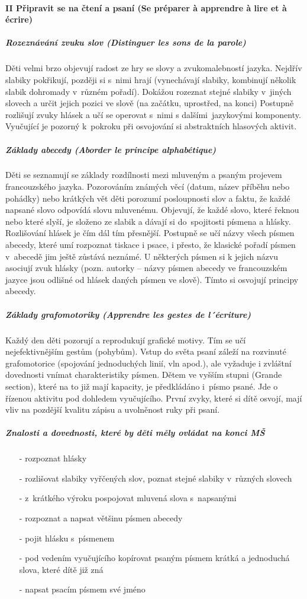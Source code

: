 			\paragraph*{II Připravit se na čtení a psaní (Se préparer à apprendre à lire et à écrire)}
				\subparagraph{Rozeznávání zvuku slov (Distinguer les sons de la parole)}
					Děti velmi brzo objevují radost ze hry se slovy a zvukomalebností jazyka. Nejdřív slabiky pokřikují, později si s nimi hrají (vynechávají slabiky, kombinují několik slabik dohromady v různém pořadí). Dokážou rozeznat stejné slabiky v jiných slovech a určit jejich pozici ve slově (na začátku, uprostřed, na konci)
					Postupně rozlišují zvuky hlásek a učí se operovat s nimi s dalšími jazykovými komponenty. Vyučující je pozorný k pokroku při osvojování si abstraktních hlasových aktivit.
				\subparagraph{Základy abecedy (Aborder le principe alphabétique)}
					Děti se seznamují se základy rozdílnosti mezi mluveným a psaným projevem francouzského jazyka. Pozorováním známých věcí (datum, název příběhu nebo pohádky) nebo krátkých vět děti porozumí posloupnosti slov a faktu, že každé napsané slovo odpovídá slovu mluvenému. 
					Objevují, že každé slovo, které řeknou nebo které slyší, je složeno ze slabik a dávají si do spojitosti písmena a hlásky. Rozlišování hlásek je čím dál tím přesnější. Postupně se učí názvy všech písmen abecedy, které umí rozpoznat tiskace i psace, i přesto, že klasické pořadí písmen v abecedě jim ještě zůstává neznámé. U některých písmen si k jejich názvu asociují zvuk hlásky (pozn. autorky – názvy písmen abecedy ve francouzském jazyce jsou odlišné od hlásek daných písmen ve slově). Tímto si osvojují principy abecedy.
				\subparagraph{Základy grafomotoriky (Apprendre les gestes de l´écriture)} 
					Každý den děti pozorují a reprodukují grafické motivy. Tím se učí nejefektivnějším gestům (pohybům). Vstup do světa psaní záleží na rozvinuté grafomotorice (spojování jednoduchých linií, vln apod.), ale vyžaduje i zvláštní dovednosti vnímat charakteristiky písmen. 
					Dětem ve vyšším stupni (Grande section), které na to již mají kapacity, je předkládáno i písmo psané. Jde o řízenou aktivitu pod dohledem vyučujícího. První zvyky, které si dítě osvojí, mají vliv na pozdější kvalitu zápisu a uvolněnost ruky při psaní. 
					
					\subparagraph{Znalosti a dovednosti, které by děti měly ovládat na konci MŠ}
					\begin{itemize}
						\setlength\itemsep{-2mm}
						\item[-] rozpoznat hlásky
						\item[-] rozlišovat slabiky vyřčených slov, poznat stejné slabiky v různých slovech
						\item[-] z krátkého výroku pospojovat mluvená slova s napsanými
						\item[-] rozpoznat a napsat většinu písmen abecedy
						\item[-] pojit hlásku s písmenem
						\item[-] pod vedením vyučujícího kopírovat psaným písmem krátká a jednoduchá slova, které dítě již zná
						\item[-] napsat psacím písmem své jméno
					\end{itemize}


